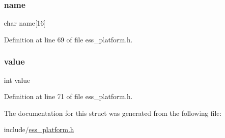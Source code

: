 \mbox{\label{structess__platform__semaphore_acd328517a6cf718155c2e6e22b671ca9}} 
\subsubsection{\texorpdfstring{name}{name}}
{\footnotesize\ttfamily char name\mbox{[}16\mbox{]}}



Definition at line 69 of file ess\+\_\+platform.\+h.

\mbox{\label{structess__platform__semaphore_ac4f474c82e82cbb89ca7c36dd52be0ed}} 
\subsubsection{\texorpdfstring{value}{value}}
{\footnotesize\ttfamily int value}



Definition at line 71 of file ess\+\_\+platform.\+h.



The documentation for this struct was generated from the following file\+:\begin{DoxyCompactItemize}
\item 
include/\hyperlink{ess__platform_8h}{ess\+\_\+platform.\+h}\end{DoxyCompactItemize}
